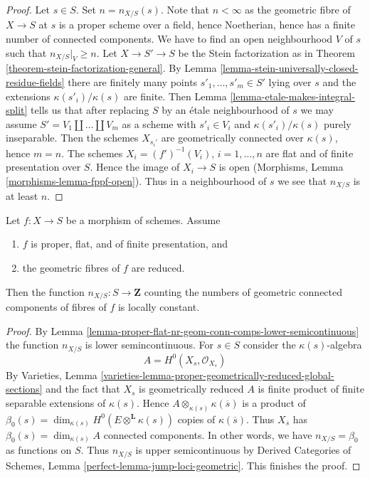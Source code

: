 \begin{proof}
Let $s \in S$. Set $n = n_{X/S}(s)$. Note that $n < \infty$ as the geometric
fibre of $X \to S$ at $s$ is a proper scheme over a field, hence Noetherian,
hence has a finite number of connected components. We have to find an open
neighbourhood $V$ of $s$ such that $n_{X/S}|_V \geq n$.
Let $X \to S' \to S$ be the Stein factorization as in
Theorem \ref{theorem-stein-factorization-general}.
By Lemma \ref{lemma-stein-universally-closed-residue-fields}
there are finitely many points $s'_1, \ldots, s'_m \in S'$ lying over $s$
and the extensions $\kappa(s'_i)/\kappa(s)$ are finite.
Then Lemma \ref{lemma-etale-makes-integral-split}
tells us that after replacing $S$ by an \'etale neighbourhood
of $s$ we may assume $S' = V_1 \amalg \ldots \amalg V_m$ as a scheme
with $s'_i \in V_i$ and $\kappa(s'_i)/\kappa(s)$ purely inseparable.
Then the schemes $X_{s_i'}$ are geometrically connected over
$\kappa(s)$, hence $m = n$. The schemes
$X_i = (f')^{-1}(V_i)$, $i = 1, \ldots, n$
are flat and of finite presentation over $S$. Hence the image of $X_i \to S$
is open (Morphisms, Lemma \ref{morphisms-lemma-fppf-open}).
Thus in a neighbourhood of $s$ we see that $n_{X/S}$ is
at least $n$.
\end{proof}

\begin{lemma}
\label{lemma-proper-flat-geom-red}
Let $f : X \to S$ be a morphism of schemes. Assume
\begin{enumerate}
\item $f$ is proper, flat, and of finite presentation, and
\item the geometric fibres of $f$ are reduced.
\end{enumerate}
Then the function $n_{X/S} : S \to \mathbf{Z}$
counting the numbers of geometric connected components
of fibres of $f$ is locally constant.
\end{lemma}

\begin{proof}
By Lemma \ref{lemma-proper-flat-nr-geom-conn-comps-lower-semicontinuous}
the function $n_{X/S}$ is lower semincontinuous.
For $s \in S$ consider the $\kappa(s)$-algebra
$$
A = H^0(X_s, \mathcal{O}_{X_s})
$$
By Varieties, Lemma
\ref{varieties-lemma-proper-geometrically-reduced-global-sections}
and the fact that $X_s$ is geometrically reduced
$A$ is finite product of finite separable extensions of $\kappa(s)$.
Hence $A \otimes_{\kappa(s)} \kappa(\overline{s})$ is a product
of $\beta_0(s) = \dim_{\kappa(s)} H^0(E \otimes^\mathbf{L} \kappa(s))$
copies of $\kappa(\overline{s})$. Thus
$X_{\overline{s}}$ has $\beta_0(s) = \dim_{\kappa(s)} A$
connected components. In other words, we have $n_{X/S} = \beta_0$
as functions on $S$. Thus $n_{X/S}$ is upper semicontinuous by
Derived Categories of Schemes, Lemma \ref{perfect-lemma-jump-loci-geometric}.
This finishes the proof.
\end{proof}

